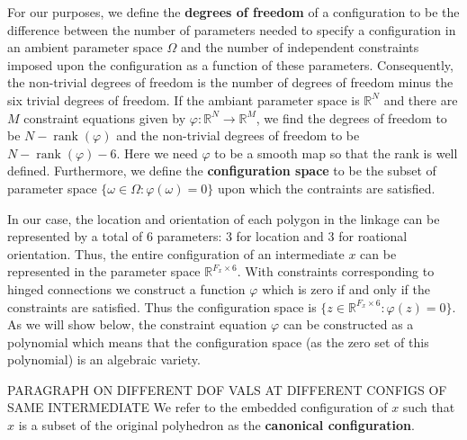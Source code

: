 

For our purposes, we define the \textbf{degrees of freedom} of a configuration to be the difference between the number of parameters needed to specify a configuration in an ambient parameter space $\Omega$ and the number of independent constraints imposed upon the configuration as a function of these parameters. Consequently, the non-trivial degrees of freedom is the number of degrees of freedom minus the six trivial degrees of freedom. If the ambiant parameter space is $\mathbb{R}^N$ and there are $M$ constraint equations given by $\varphi : \mathbb{R}^N \to \mathbb{R}^M$, we find the degrees of freedom to be $N - \operatorname{rank}(\varphi)$ and the non-trivial degrees of freedom to be $N - \operatorname{rank}(\varphi) - 6$. Here we need $\varphi$ to be a smooth map so that the rank is well defined. Furthermore, we define the \textbf{configuration space} to be the subset of parameter space $\{\omega \in \Omega : \varphi(\omega) = 0\}$ upon which the contraints are satisfied.

In our case, the location and orientation of each polygon in the linkage can be represented by a total of 6 parameters: 3 for location and 3 for roational orientation. Thus, the entire configuration of an intermediate $x$ can be represented in the parameter space $\mathbb{R}^{F_x\times6}$. With constraints corresponding to hinged connections we construct a function $\varphi$ which is zero if and only if the constraints are satisfied. Thus the configuration space is $\{z \in \mathbb{R}^{F_x\times6} : \varphi(z) =0\}$. As we will show below, the constraint equation $\varphi$ can be constructed as a polynomial which means that the configuration space (as the zero set of this polynomial) is an algebraic variety. 

 PARAGRAPH ON DIFFERENT DOF VALS AT DIFFERENT CONFIGS OF SAME INTERMEDIATE We refer to the embedded configuration of $x$ such that $x$ is a subset of the original polyhedron as the \textbf{canonical configuration}.


